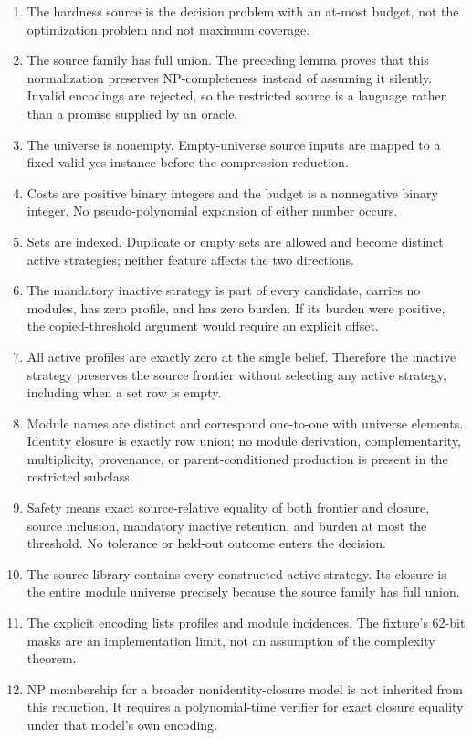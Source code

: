 \begin{enumerate}
\item The hardness source is the decision problem with an at-most budget, not
the optimization problem and not maximum coverage.
\item The source family has full union. The preceding lemma proves that this
normalization preserves NP-completeness instead of assuming it silently.
Invalid encodings are rejected, so the restricted source is a language rather
than a promise supplied by an oracle.
\item The universe is nonempty. Empty-universe source inputs are mapped to a
fixed valid yes-instance before the compression reduction.
\item Costs are positive binary integers and the budget is a nonnegative
binary integer. No pseudo-polynomial expansion of either number occurs.
\item Sets are indexed. Duplicate or empty sets are allowed and become
distinct active strategies; neither feature affects the two directions.
\item The mandatory inactive strategy is part of every candidate, carries no
modules, has zero profile, and has zero burden. If its burden were positive,
the copied-threshold argument would require an explicit offset.
\item All active profiles are exactly zero at the single belief. Therefore the
inactive strategy preserves the source frontier without selecting any active
strategy, including when a set row is empty.
\item Module names are distinct and correspond one-to-one with universe
elements. Identity closure is exactly row union; no module derivation,
complementarity, multiplicity, provenance, or parent-conditioned production is
present in the restricted subclass.
\item Safety means exact source-relative equality of both frontier and
closure, source inclusion, mandatory inactive retention, and burden at most
the threshold. No tolerance or held-out outcome enters the decision.
\item The source library contains every constructed active strategy. Its
closure is the entire module universe precisely because the source family has
full union.
\item The explicit encoding lists profiles and module incidences. The
fixture's 62-bit masks are an implementation limit, not an assumption of the
complexity theorem.
\item NP membership for a broader nonidentity-closure model is not inherited
from this reduction. It requires a polynomial-time verifier for exact closure
equality under that model's own encoding.
\end{enumerate}

